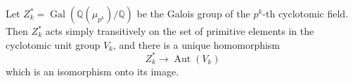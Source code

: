 Let $Z_k^* = \operatorname{Gal}(\mathbb{Q}(\mu_{p^k})/\mathbb{Q})$ be the Galois group of the $p^k$-th cyclotomic field. Then $Z_k^*$ acts simply transitively on the set of primitive elements in the cyclotomic unit group $V_k$, and there is a unique homomorphism
$$
Z_k^* \longrightarrow \operatorname{Aut}(V_k)
$$
which is an isomorphism onto its image.
